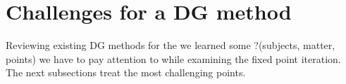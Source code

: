 

\section{Challenges for a \MA DG method}
Reviewing existing DG methods for the \MA we learned some ?(subjects, matter, points) we have to pay attention to  while examining the fixed point iteration. The next subsections treat the most challenging points.

